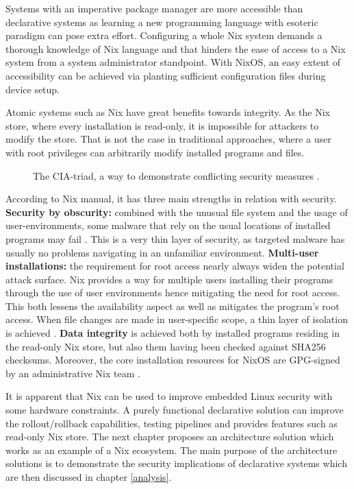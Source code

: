 Systems with an imperative package manager are more accessible than
declarative systems as learning a new programming language with
esoteric paradigm can pose extra effort. Configuring a whole Nix
system demands a thorough knowledge of Nix language and that
hinders the ease of access to a Nix system from a system
administrator standpoint. With NixOS, an easy extent of accessibility
can be achieved via planting sufficient configuration files during
device setup.

Atomic systems such as Nix have great benefits towards integrity. As
the Nix store, where every installation is read-only,
it is impossible for attackers to modify the store. That is not the
case in traditional approaches, where a user with root privileges can arbitrarily modify installed
programs and files.

\begin{figure}[t!]
\centerline{}
\caption{The CIA-triad, a way to demonstrate conflicting security
  measures \cite{hughes2013quantitative}.}
\label{ciatriad}
\end{figure}

According to Nix manual, it has three main strengths in relation with
security. \textbf{Security by obscurity: }combined with the unusual
file system and the usage of user-environments, some malware that rely
on the usual locations of installed programs may fail
\cite{nixosSecurityNixOS}. This is a very thin layer of security, as
targeted malware has usually no problems navigating in an unfamiliar
environment. \textbf{Multi-user installations: }the requirement for
root access nearly always widen the potential attack surface. Nix
provides a way for multiple users installing their programs through
the use of user environments hence mitigating the need for root
access. This both lessens the availability aspect as well as
mitigates the program's root access. When file changes are made in
user-specific scope, a thin layer of isolation is achieved
\cite{nixosNixOSManual}. \textbf{Data integrity} is achieved both by
installed programs residing in the read-only Nix store, but also them
having been checked against SHA256 checksums. Moreover, the core
installation resources for NixOS are GPG-signed by an administrative
Nix team \cite{nixosSecurityNixOS}.

It is apparent that Nix can be used to improve embedded Linux security
with some hardware constraints. A purely functional declarative
solution can improve the rollout/rollback capabilities, testing
pipelines and provides features such as read-only Nix store. The next
chapter proposes an architecture solution which works as an example of
a Nix ecosystem. The main purpose of the architecture solutions is to
demonstrate the security implications of declarative systems which are then discussed 
in chapter \ref{analysis}. 
